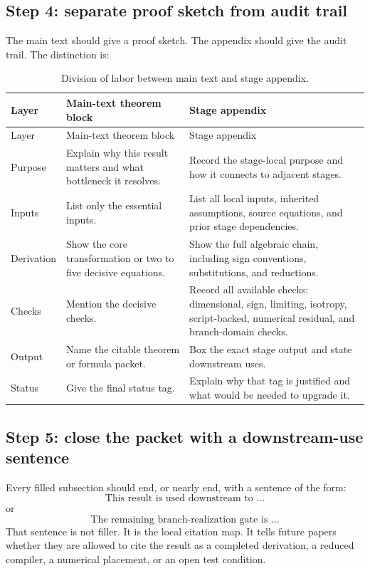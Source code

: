 \subsection{Step 4: separate proof sketch from audit trail}
\label{subsec:workflow-proof-sketch-vs-audit-trail}

The main text should give a proof sketch.  The appendix should give the audit trail.  The distinction is:

\begin{longtable}{@{}L{0.24\textwidth}L{0.35\textwidth}L{0.31\textwidth}@{}}
\caption{Division of labor between main text and stage appendix.}\label{tab:main-vs-appendix-fill}\\
\toprule
Layer & Main-text theorem block & Stage appendix \\
\midrule
\endfirsthead
\toprule
Layer & Main-text theorem block & Stage appendix \\
\midrule
\endhead
Purpose & Explain why this result matters and what bottleneck it resolves. & Record the stage-local purpose and how it connects to adjacent stages. \\
\addlinespace
Inputs & List only the essential inputs. & List all local inputs, inherited assumptions, source equations, and prior stage dependencies. \\
\addlinespace
Derivation & Show the core transformation or two to five decisive equations. & Show the full algebraic chain, including sign conventions, substitutions, and reductions. \\
\addlinespace
Checks & Mention the decisive checks. & Record all available checks: dimensional, sign, limiting, isotropy, script-backed, numerical residual, and branch-domain checks. \\
\addlinespace
Output & Name the citable theorem or formula packet. & Box the exact stage output and state downstream uses. \\
\addlinespace
Status & Give the final status tag. & Explain why that tag is justified and what would be needed to upgrade it. \\
\bottomrule
\end{longtable}

\subsection{Step 5: close the packet with a downstream-use sentence}
\label{subsec:workflow-downstream-use-sentence}

Every filled subsection should end, or nearly end, with a sentence of the form:
\[
\text{This result is used downstream to \ldots}
\]
or
\[
\text{The remaining branch-realization gate is \ldots}
\]
That sentence is not filler.  It is the local citation map.  It tells future papers whether they are allowed to cite the result as a completed derivation, a reduced compiler, a numerical placement, or an open test condition.

